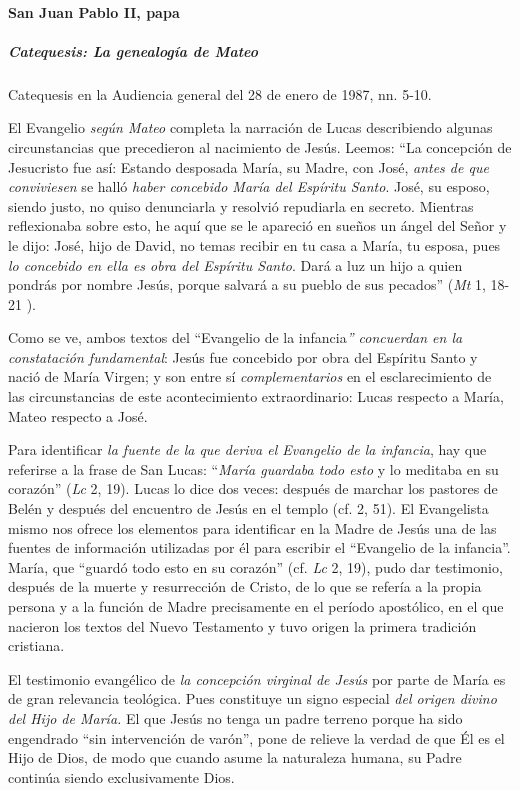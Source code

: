 \documentclass[]{article}
\let\oldparagraph\paragraph
\renewcommand{\paragraph}[1]{\oldparagraph{#1}\mbox{}}
\let\oldsubparagraph\subparagraph
\renewcommand{\subparagraph}[1]{\oldsubparagraph{#1}\mbox{}}
\begin{document}
\paragraph{San Juan Pablo II, papa}

\subparagraph{Catequesis: La genealogía de
Mateo}

Catequesis en la Audiencia general del 28 de enero de 1987, nn. 5-10.

El Evangelio \emph{según Mateo} completa la narración de Lucas
describiendo algunas circunstancias que precedieron al nacimiento de
Jesús. Leemos: ``La concepción de Jesucristo fue así: Estando desposada
María, su Madre, con José, \emph{antes de que conviviesen} se halló
\emph{haber concebido María del Espíritu Santo}. José, su esposo, siendo
justo, no quiso denunciarla y resolvió repudiarla en secreto. Mientras
reflexionaba sobre esto, he aquí que se le apareció en sueños un ángel
del Señor y le dijo: José, hijo de David, no temas recibir en tu casa a
María, tu esposa, pues \emph{lo concebido en ella es obra del Espíritu
Santo}. Dará a luz un hijo a quien pondrás por nombre Jesús, porque
salvará a su pueblo de sus pecados'' (\emph{Mt} 1, 18-21 ).

Como se ve, ambos textos del ``Evangelio de la infancia\emph{''
concuerdan en la constatación fundamental}: Jesús fue concebido por obra
del Espíritu Santo y nació de María Virgen; y son entre sí
\emph{complementarios} en el esclarecimiento de las circunstancias de
este acontecimiento extraordinario: Lucas respecto a María, Mateo
respecto a José.

Para identificar \emph{la fuente de la que deriva el Evangelio de la
infancia}, hay que referirse a la frase de San Lucas: ``\emph{María
guardaba todo esto} y lo meditaba en su corazón'' (\emph{Lc} 2, 19).
Lucas lo dice dos veces: después de marchar los pastores de Belén y
después del encuentro de Jesús en el templo (cf. 2, 51). El Evangelista
mismo nos ofrece los elementos para identificar en la Madre de Jesús una
de las fuentes de información utilizadas por él para escribir el
``Evangelio de la infancia''. María, que ``guardó todo esto en su
corazón'' (cf. \emph{Lc} 2, 19), pudo dar testimonio, después de la
muerte y resurrección de Cristo, de lo que se refería a la propia
persona y a la función de Madre precisamente en el período apostólico,
en el que nacieron los textos del Nuevo Testamento y tuvo origen la
primera tradición cristiana.

El testimonio evangélico de \emph{la concepción virginal de Jesús} por
parte de María es de gran relevancia teológica. Pues constituye un signo
especial \emph{del origen divino del Hijo de María.} El que Jesús no
tenga un padre terreno porque ha sido engendrado ``sin intervención de
varón'', pone de relieve la verdad de que Él es el Hijo de Dios, de modo
que cuando asume la naturaleza humana, su Padre continúa siendo
exclusivamente Dios.
\end{document}
